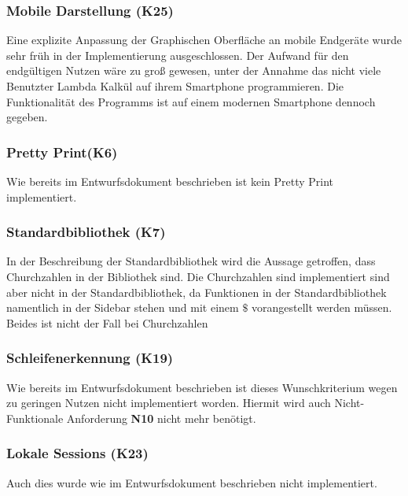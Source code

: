\documentclass[parskip=full,11pt,twoside]{scrartcl}
\begin{document}

\subsubsection{Mobile Darstellung (K25)}
	Eine explizite Anpassung der Graphischen Oberfläche an mobile Endgeräte wurde sehr früh in der Implementierung
	ausgeschlossen.
    Der Aufwand für den endgültigen Nutzen wäre zu groß gewesen, unter der Annahme das nicht viele Benutzter Lambda
    Kalkül auf ihrem Smartphone programmieren.
    Die Funktionalität des Programms ist auf einem modernen Smartphone dennoch gegeben.



\subsubsection{Pretty Print(K6)}
	Wie bereits im Entwurfsdokument beschrieben ist kein Pretty Print implementiert.
	
\subsubsection{Standardbibliothek (K7)}
	In der Beschreibung der Standardbibliothek wird die Aussage getroffen, dass
	Churchzahlen in der Bibliothek sind.
	Die Churchzahlen sind implementiert sind aber nicht in der Standardbibliothek,
	da Funktionen in der Standardbibliothek namentlich in der Sidebar stehen und mit 
	einem $\$$ vorangestellt werden müssen.
	Beides ist nicht der Fall bei Churchzahlen

\subsubsection{Schleifenerkennung (K19)}
	Wie bereits im Entwurfsdokument beschrieben ist dieses Wunschkriterium 
	wegen zu geringen Nutzen nicht implementiert worden. 
	Hiermit wird auch Nicht-Funktionale Anforderung \textbf{N10} nicht
	mehr benötigt.
	
\subsubsection{Lokale Sessions (K23)}
	Auch dies wurde wie im Entwurfsdokument beschrieben nicht implementiert.
\end{document}

